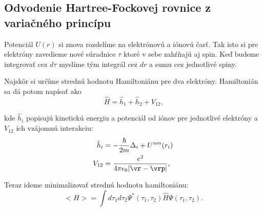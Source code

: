 \renewcommand{\thesection}{A.\arabic{section}}
\renewcommand{\theequation}{A.\arabic{equation}}
\renewcommand{\thefigure}{A.\arabic{figure}}
\setcounter{equation}{0}
\subsection*{Odvodenie Hartree-Fockovej rovnice z variačného princípu}
Potenciál $U(r)$ si znova rozdelíme na elektrónovú a iónovú časť. Tak isto si pre elektróny zavedieme nové súradnice $\tau$ ktoré v sebe zahŕňajú aj spin.
Keď budeme integrovať cez $d\tau$ myslíme tým integrál cez $dr$ a sumu cez jednotlivé spiny.

Najskôr si určíme strednú hodnotu Hamiltoniánu pre dva elektróny. Hamiltonián sa dá potom napísať ako
\begin{equation}
\label{eq:hm}
\hat H =\hat h_1+ \hat h_2 + V_{12} \text{,}
\end{equation}

kde $\hat h_i$ popisujú kinetickú energiu a potenciál od iónov pre jednotlivé elektróny a $V_{12}$ ich vzájomnú interakciu:
\begin{align}
 \hat h_i&=-\frac{\hbar}{2m}\Delta_{i}+U^{ion}(r_i) \\ \notag
 V_{12} &= \frac {e^2}{4\pi \epsilon_0|\vr-\vrp|} \text{,}
\end{align}

Teraz ideme minimalizovať strednú hodnotu hamiltoniánu:
\begin{equation}
 \label{eq:mvh}
 <H>=\int{d\tau_1d\tau_2\Psi^*(\tau_1,\tau_2)\hat H\Psi(\tau_1,\tau_2)} \text{.}
\end{equation}



